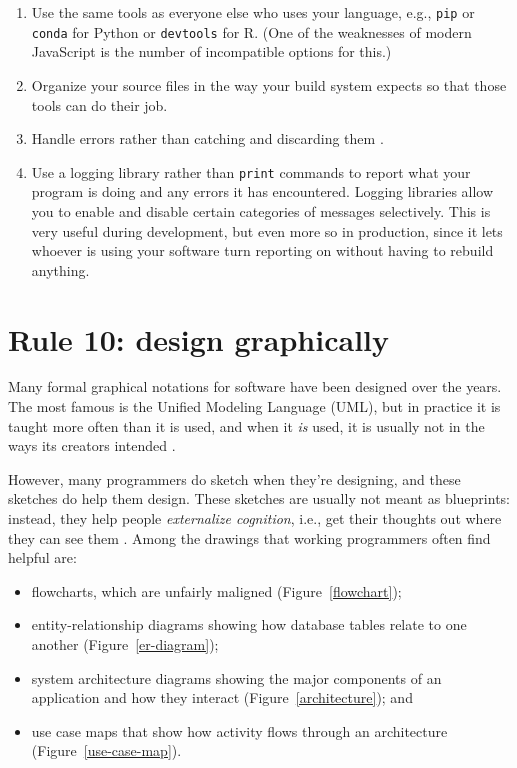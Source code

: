 \documentclass[10pt,letterpaper]{article}
\begin{document}
\begin{enumerate}

\item
  Use the same tools as everyone else who uses your language,
  e.g., \texttt{pip} or \texttt{conda} for Python or \texttt{devtools} for R.
  (One of the weaknesses of modern JavaScript is the number of incompatible options for this.)

\item
  Organize your source files in the way your build system expects
  so that those tools can do their job.

\item
  Handle errors rather than catching and discarding them \cite{Nakshatri2016}.

\item
  Use a logging library rather than \texttt{print} commands
  to report what your program is doing and any errors it has encountered.
  Logging libraries allow you to enable and disable certain categories of messages selectively.
  This is very useful during development,
  but even more so in production,
  since it lets whoever is using your software turn reporting on
  without having to rebuild anything.

\end{enumerate}

\section*{Rule 10: design graphically}

Many formal graphical notations for software have been designed over the years.
The most famous is the Unified Modeling Language (UML),
but in practice it is taught more often than it is used,
and when it \emph{is} used,
it is usually not in the ways its creators intended \cite{Petre2013}.

However,
many programmers do sketch when they're designing,
and these sketches do help them design.
These sketches are usually not meant as blueprints:
instead,
they help people \emph{externalize cognition},
i.e.,
get their thoughts out where they can see them \cite{Cherubini2007,Petre2016}.
Among the drawings that working programmers often find helpful are:

\begin{itemize}
\item
  flowcharts, which are unfairly maligned \cite{Scanlan1989}
  (Figure~\ref{flowchart});
\item
  entity-relationship diagrams showing how database tables relate to one another
  (Figure~\ref{er-diagram});
\item
  system architecture diagrams showing the major components of an application
  and how they interact (Figure~\ref{architecture});
  and
\item
  use case maps that show how activity flows through an architecture \cite{Reekie2006}
  (Figure~\ref{use-case-map}).
\end{itemize}
\end{document}
